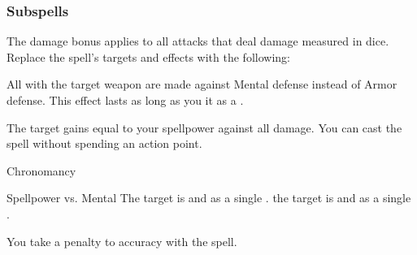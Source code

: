 \subsubsection{Subspells}
The damage bonus applies to all attacks that deal damage measured in dice.
Replace the spell's targets and effects with the following:
\begin{spellcontent}
\begin{augmenttargetinginfo}
\end{augmenttargetinginfo}
\begin{augmenteffects}
\spelleffect
All  with the target weapon are made against Mental defense instead of Armor defense.
This effect lasts as long as you  it as a .
\end{augmenteffects}
\end{spellcontent}
The target gains  equal to your spellpower against all damage.
You can cast the spell without spending an action point.
\begin{spellsection}{Chronomancy}
\begin{spellheader}
\end{spellheader}
\begin{spellcontent}
\begin{spelltargetinginfo}
\end{spelltargetinginfo}
\begin{spelleffects}
\begin{spellattack}{Spellpower vs. Mental}
\spellsuccess
The target is  and  as a single .
\spellcritical
the target is  and  as a single .
\end{spellattack}
\end{spelleffects}
\end{spellcontent}
\begin{spellfooter}
\end{spellfooter}
\begin{spellsubcontent}
\begin{spellcantrip}
You take a  penalty to accuracy with the spell.
\end{spellcantrip}
\end{spellsubcontent}
\end{spellsection}

